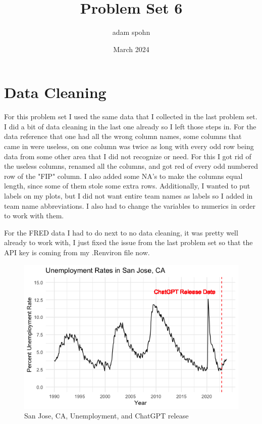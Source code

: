 \documentclass{article}
\title{Problem Set 6}
\author{adam spohn}
\date{March 2024}
\begin{document}
\maketitle

\section{Data Cleaning}

For this problem set I used the same data that I collected in the last problem set. I did a bit of data cleaning in the last one already so I left those steps in. For the data reference that one had all the wrong column names, some columns that came in were useless, on one column was twice as long with every odd row being data from some other area that I did not recognize or need. For this I got rid of the useless columns, renamed all the columns, and got red of every odd numbered row of the "FIP" column. I also added some NA's to make the columns equal length, since some of them stole some extra rows. Additionally, I wanted to put labels on my plots, but I did not want entire team names as labels so I added in team name abbreviations. I also had to change the variables to numerics in order to work with them. 

For the FRED data I had to do next to no data cleaning, it was pretty well already to work with, I just fixed the issue from the last problem set so that the API key is coming from my .Renviron file now.

\begin{figure}
    \centering
    \includegraphics[width=0.8\linewidth]{PS6a_Spohn.png}
    \caption{San Jose, CA, Unemployment, and ChatGPT release}
\end{figure}
\end{document}
